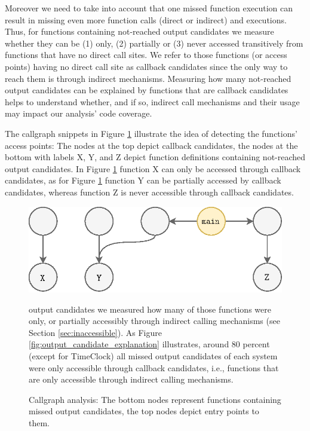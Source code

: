 \documentclass[sigconf]{acmart}
\begin{document}
Moreover we need to take into account that one missed function execution can
result in missing even more function calls (direct or indirect) and executions.
Thus, for functions containing not-reached output candidates we measure whether
they can be (1) only, (2) partially or (3) never accessed transitively from
functions that have no direct call sites. We refer to those functions (or
access points) having no direct call site as callback candidates since the only
way to reach them is through indirect mechanisms. Measuring how many
not-reached output candidates can be explained by functions that are callback
candidates helps to understand whether, and if so, indirect call mechanisms and
their usage may impact our analysis’ code coverage.

The callgraph snippets in Figure \ref{fig:callgraph} illustrate the idea of
detecting the functions’ access points: The nodes at the top depict callback
candidates, the nodes at the bottom with labels X, Y, and Z depict function
definitions containing not-reached output candidates. In Figure
\ref{fig:callgraph} function X can only be accessed through callback
candidates, as for Figure \ref{fig:callgraph} function Y can be partially
accessed by callback candidates, whereas function Z is never accessible through
callback candidates.

\begin{figure}[t!]
	\includegraphics[scale=0.55]{images-paper/callgraph_cases}
    \caption{Callgraph analysis: The bottom nodes represent functions containing missed output candidates, the top nodes depict entry points to them.}
    \label{fig:callgraph} output candidates we measured how many of those functions were only, or partially accessibly through indirect calling mechanisms (see Section \ref{sec:inaccessible}). As Figure \ref{fig:output_candidate_explanation} illustrates, around 80 percent (except for \textsf{TimeClock}) all missed output candidates of each system were only accessible through callback candidates, i.e., functions that are only accessible through indirect calling mechanisms.
	
\end{figure}
\end{document}
